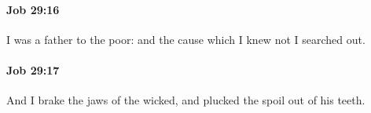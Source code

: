		\paragraph{Job 29:16} %
			\label{JOB-29-16}

			I was a father to the poor: and the cause which I knew not I searched out.


		\paragraph{Job 29:17} %
			\label{JOB-29-17}

			And I brake the jaws of the wicked, and plucked the spoil out of his teeth.


